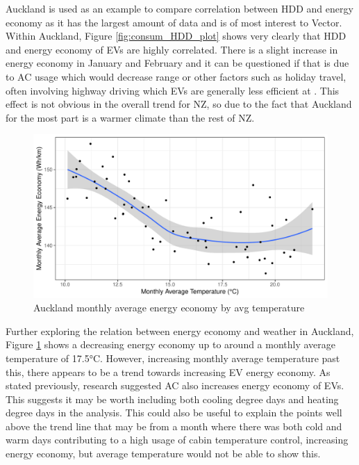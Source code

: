 \documentclass[
]{article}
\begin{document}
Auckland is used as an example to compare correlation between HDD and
energy economy as it has the largest amount of data and is of most
interest to Vector. Within Auckland, Figure \ref{fig:consum_HDD_plot}
shows very clearly that HDD and energy economy of EVs are highly
correlated. There is a slight increase in energy economy in January and
February and it can be questioned if that is due to AC usage which would
decrease range \cite{ev_range} or other factors such as holiday travel,
often involving highway driving which EVs are generally less efficient
at \cite{ev_highway}. This effect is not obvious in the overall trend
for NZ, so due to the fact that Auckland for the most part is a warmer
climate than the rest of NZ.

\begin{figure}
\centering
\includegraphics{mixed_model_files/figure-latex/temp_consum_plot-1.pdf}
\caption{Auckland monthly average energy economy by avg
temperature\label{fig:temp_consum_plot}}
\end{figure}

Further exploring the relation between energy economy and weather in
Auckland, Figure \ref{fig:temp_consum_plot} shows a decreasing energy
economy up to around a monthly average temperature of 17.5°C. However,
increasing monthly average temperature past this, there appears to be a
trend towards increasing EV energy economy. As stated previously,
research \cite{ev_range} suggested AC also increases energy economy of
EVs. This suggests it may be worth including both cooling degree days
and heating degree days in the analysis. This could also be useful to
explain the points well above the trend line that may be from a month
where there was both cold and warm days contributing to a high usage of
cabin temperature control, increasing energy economy, but average
temperature would not be able to show this.
\end{document}
